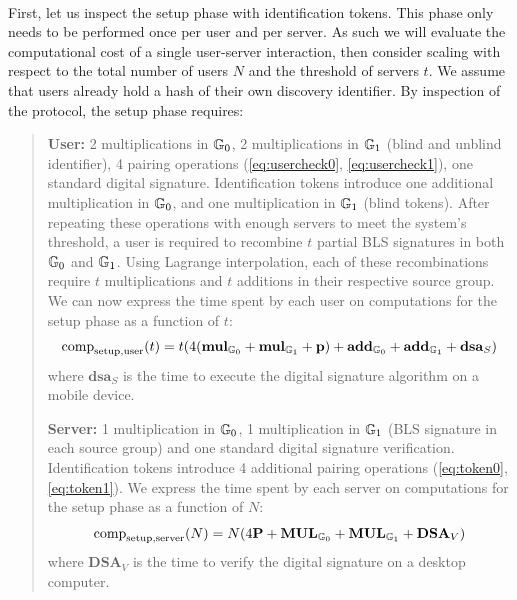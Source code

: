 	\paragraph{} First, let us inspect the setup phase with identification tokens. This phase only needs to be performed once per user and per server. As such we will evaluate the computational cost of a single user-server interaction, then consider scaling with respect to the total number of users $N$ and the threshold of servers $t$. We assume that users already hold a hash of their own discovery identifier. By inspection of the protocol, the setup phase requires: 
	\begin{quote}
		\textbf{User:} 2 multiplications in $\mathbb{G}_0$, 2 multiplications in $\mathbb{G}_1$ (blind and unblind identifier), 4 pairing operations (\autoref{eq:usercheck0}, \autoref{eq:usercheck1}), one standard digital signature. Identification tokens introduce one additional multiplication in $\mathbb{G}_0$, and one multiplication in $\mathbb{G}_1$ (blind tokens). After repeating these operations with enough servers to meet the system's threshold, a user is required to recombine $t$ partial BLS signatures in both $\mathbb{G}_0$ and $\mathbb{G}_1$. Using Lagrange interpolation, each of these recombinations require $t$ multiplications and $t$ additions in their respective source group. We can now express the time spent by each user on computations for the setup phase as a function of $t$:
		\begin{equation}
			\mathrm{comp}_{\mathrm{setup, user}}(t) = t(4(\mathbf{mul}_{\mathbb{G}_0} + \mathbf{mul}_{\mathbb{G}_1} + \mathbf{p}) + \mathbf{add}_{\mathbb{G}_0} + \mathbf{add}_{\mathbb{G}_1} + \mathbf{dsa}_S)
		\end{equation}
		\noindent where $\mathbf{dsa}_S$ is the time to execute the digital signature algorithm on a mobile device.
		
				
		\textbf{Server:} 1 multiplication in $\mathbb{G}_0$, 1 multiplication in $\mathbb{G}_1$ (BLS signature in each source group) and one standard digital signature verification. Identification tokens introduce 4 additional pairing operations (\autoref{eq:token0}, \autoref{eq:token1}). We express the time spent by each server on computations for the setup phase as a function of $N$:
		\begin{equation}
			\mathrm{comp}_{\mathrm{setup, server}}(N) = N(4\mathbf{P} + \mathbf{MUL}_{\mathbb{G}_0} + \mathbf{MUL}_{\mathbb{G}_1} + \mathbf{DSA}_V)
		\end{equation}
		\noindent where $\mathbf{DSA}_V$ is the time to verify the digital signature on a desktop computer.
	\end{quote}
	

